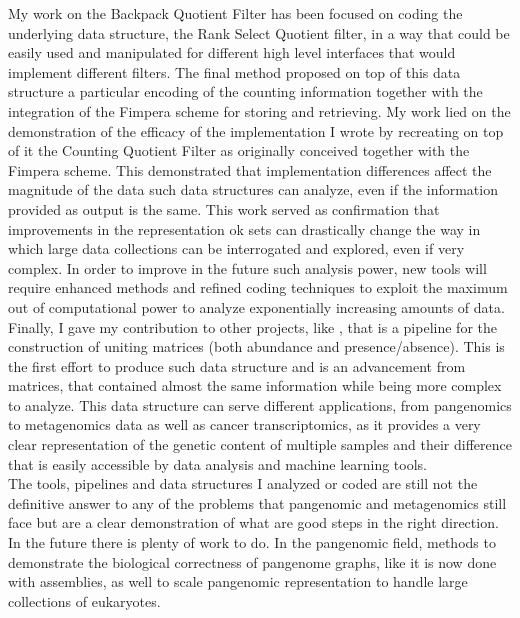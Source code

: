 My work on the Backpack Quotient Filter has been focused on coding the underlying data structure, the Rank Select Quotient filter, in a way that could be easily used and manipulated for different high level interfaces that would implement different filters. The final method proposed on top of this data structure a particular encoding of the counting information together with the integration of the Fimpera scheme for \kmer storing and retrieving. My work lied on the demonstration of the efficacy of the implementation I wrote by recreating on top of it the Counting Quotient Filter as originally conceived together with the Fimpera scheme. This demonstrated that implementation differences affect the magnitude of the data such data structures can analyze, even if the information provided as output is the same. This work served as confirmation that  improvements in the representation ok \kmer sets can drastically change the way in which large data collections can be interrogated and explored, even if very complex. In order to improve in the future such analysis power, new tools will require enhanced methods and refined coding techniques to exploit the maximum out of computational power to analyze exponentially increasing amounts of data.\\
Finally, I gave my contribution to other projects, like \muset, that is a pipeline for the construction of uniting matrices (both abundance and presence/absence). This is the first effort to produce such data structure and is an advancement from \kmer matrices, that contained almost the same information while being more complex to analyze. This data structure can serve different applications, from pangenomics to metagenomics data as well as cancer transcriptomics, as it provides a very clear representation of the genetic content of multiple samples and their difference that is easily accessible by data analysis and machine learning tools.\\
The tools, pipelines and data structures I analyzed or coded are still not the definitive answer to any of the problems that pangenomic and metagenomics still face but are a clear demonstration of what are good steps in the right direction. In the future there is plenty of work to do. In the pangenomic field, methods to demonstrate the biological correctness of pangenome graphs, like it is now done with assemblies, as well to scale pangenomic representation to handle large collections of eukaryotes.

